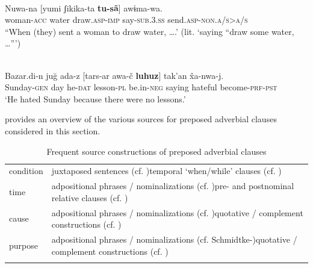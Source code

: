 \documentclass[output=paper]{langsci/langscibook}
\begin{document}
\ea\label{ex:key:}
\\
\gll   Nuwa-na  [yumi  ʃikika-ta  \textbf{tu-sã}]  awɨma-wa.\\
       woman-\textsc{acc}  water  draw.\textsc{asp-imp}  say-\textsc{sub.3.ss}  send.\textsc{asp-non.a/s>a/s}\\
\glt “When (they) sent a woman to draw water, ….' (lit. ‘saying “draw some water, …”’) 
\z

\ea\label{ex:key:}
\\
\gll   Bazar.di-n  juğ  ada-z  [tars-ar  awa-č   \textbf{luhuz}]  tak’an  \^{x}a-nwa-j.\\
       Sunday-\textsc{gen}  day  he-\textsc{dat}  lesson-\textsc{pl}  be.in-\textsc{neg}   saying  hateful  become-\textsc{prf-pst}\\
\glt   `He hated Sunday because there were no lessons.'
\z

 provides an overview of the various sources for preposed adverbial clauses considered in this section.

\begin{table}
\begin{tabularx}{\textwidth}{lQ}
\lsptoprule
condition & juxtaposed sentences (cf. \citealt{Haiman1985})\newline 	  temporal ‘when/while’ clauses (cf. \citealt{Traugott1985})\\
\tablevspace
time      & adpositional phrases / nominalizations (cf. \citealt{Genetti1991})\newline 	  pre- and postnominal relative clauses (cf. \citealt{Givón1991})\\
\tablevspace
cause    &  adpositional phrases / nominalizations (cf. \citealt{Genetti1991})\newline 	  quotative / complement constructions (cf. \citealt{Ebert1991})\\
\tablevspace
purpose &  adpositional phrases / nominalizations (cf. Schmidtke-\citealt{Bode2009})\newline  quotative / complement constructions (cf. \citealt{Güldemann2008})\\
\lspbottomrule
\end{tabularx}

\caption{Frequent source constructions of preposed adverbial clauses}
\label{tab:diessel:4}
\end{table}
\end{document}
